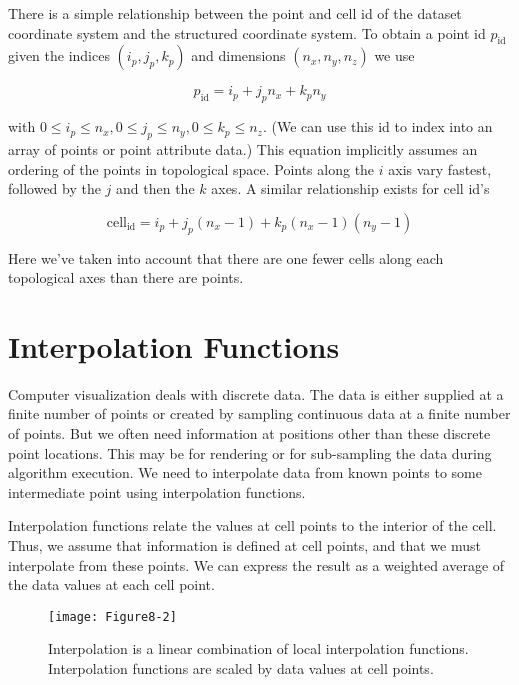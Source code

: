There is a simple relationship between the point and cell id of the dataset coordinate system and the structured coordinate system. To obtain a point id $p_\text{id}$ given the indices $(i_p, j_p, k_p)$ and dimensions $(n_x, n_y, n_z)$ we use

\begin{equation}\label{eq:8.2}
p_\text{id} = i_p +j_p n_x + k_p n_y
\end{equation}

with $0 \leq i_p \leq n_x, 0 \leq j_p \leq n_y, 0 \leq k_p \leq n_z$. (We can use this id to index into an array of points or point attribute data.) This equation implicitly assumes an ordering of the points in topological space. Points along the $i$ axis vary fastest, followed by the $j$ and then the $k$ axes. A similar relationship exists for cell id's

\begin{equation}\label{eq:8.3}
\text{cell}_\text{id} = i_p + j_p (n_x - 1) + k_p (n_x - 1)(n_y - 1)
\end{equation}

Here we've taken into account that there are one fewer cells along each topological axes than there are points.

\section{Interpolation Functions}
\label{sec:interpolation_functions}

Computer visualization deals with discrete data. The data is either supplied at a finite number of points or created by sampling continuous data at a finite number of points. But we often need information at positions other than these discrete point locations. This may be for rendering or for sub-sampling the data during algorithm execution. We need to interpolate data from known points to some intermediate point using interpolation functions.

Interpolation functions relate the values at cell points to the interior of the cell. Thus, we assume that information is defined at cell points, and that we must interpolate from these points. We can express the result as a weighted average of the data values at each cell point.

\begin{figure}[!htb]
    \centering
    \texttt{[image: Figure8-2]}\\
    \caption{Interpolation is a linear combination of local interpolation functions. Interpolation functions are scaled by data values at cell points.}\label{fig:Figure8-2}
\end{figure}

